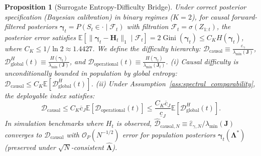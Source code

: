 \documentclass[twoside]{article}
\newtheorem{proposition}{Proposition}
\theoremstyle{definition}
\newcommand{\E}{\mathbb{E}}
\begin{document}
\begin{proposition}[Surrogate Entropy-Difficulty Bridge]
\label{prop:bridge}
Under correct posterior specification (Bayesian calibration) in binary regimes ($K=2$), for causal forward-filtered posteriors $\boldsymbol{\gamma}_t = P(S_t \in \cdot \mid \mathcal{F}_t)$ with filtration $\mathcal{F}_t = \sigma(Z_{1:t})$, the posterior error satisfies $\E[\|\boldsymbol{\gamma}_t - \boldsymbol{H}_t\|_1 \mid \mathcal{F}_t] = 2 \operatorname{Gini}(\boldsymbol{\gamma}_t) \le C_K H(\boldsymbol{\gamma}_t)$, where $C_K \le 1/\ln 2 \approx 1.4427$.
We define the difficulty hierarchy: $\mathcal{D}_{\mathrm{causal}} \equiv \frac{\varepsilon_\gamma}{\lambda_{\min}(\boldsymbol{J})}$, $\mathcal{D}_{\mathrm{global}}^H(t) \equiv \frac{H(\boldsymbol{\gamma}_t)}{\lambda_{\min}(\boldsymbol{J})}$, and $\mathcal{D}_{\mathrm{operational}}(t) \equiv \frac{H(\boldsymbol{\gamma}_t)}{\lambda_{\min}(\boldsymbol{J}_t)}$.
(i) Causal difficulty is unconditionally bounded in population by global entropy: $\mathcal{D}_{\mathrm{causal}} \le C_K \E\left[ \mathcal{D}_{\mathrm{global}}^H(t) \right]$.
(ii) Under Assumption~\ref{ass:spectral_comparability}, the deployable index satisfies:
\begin{equation}
\label{eq:bridge_bound}
    \mathcal{D}_{\mathrm{causal}} \le C_K \overline{c}_J \E[\mathcal{D}_{\mathrm{operational}}(t)] \le \frac{C_K \overline{c}_J}{\underline{c}_J} \E[\mathcal{D}_{\mathrm{global}}^H(t)].
\end{equation}
In simulation benchmarks where $H_t$ is observed, $\hat{\mathcal{D}}_{\mathrm{causal}, N} \equiv \hat{\varepsilon}_{\gamma, N} / \lambda_{\min}(\boldsymbol{J})$ converges to $\mathcal{D}_{\mathrm{causal}}$ with $\mathcal{O}_P(N^{-1/2})$ error for population posteriors $\boldsymbol{\gamma}_t(\boldsymbol{\Lambda}^*)$ (preserved under $\sqrt{N}$-consistent $\hat{\boldsymbol{\Lambda}}$).
\end{proposition}
\end{document}
